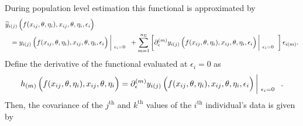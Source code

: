 \documentclass{article}
\begin{document}
During population level estimation this functional is approximated by
  \begin{eqnarray}
    \lefteqn{ \widetilde{y}_{i(j)} \left( \rule{0.0in}{0.15in} f(x_{ij}, \theta, \eta_i), 
        x_{ij}, \theta, \eta_i, \epsilon_i \right) } 
        \nonumber \\
    & & = y_{i(j)}\left( \rule{0.0in}{0.15in} f(x_{ij}, \theta, \eta_i), 
        x_{ij}, \theta, \eta_i, \epsilon_i \right)
        \left| \!
          \begin{array}{l}
            \\
            {\scriptstyle \epsilon_i = 0}
          \end{array}
        \right.
      + \sum_{m=1}^{n_{\Sigma}} \left[ \partial_{\epsilon}^{(m)} 
        y_{i(j)}\left( \rule{0.0in}{0.15in} f(x_{ij}, \theta, \eta_i), 
        x_{ij}, \theta, \eta_i, \epsilon_i \right)
        \left| \!
          \begin{array}{l}
            \\
            {\scriptstyle \epsilon_i = 0}
          \end{array}
        \right.
        \right] \epsilon_{i(m)} .
  \end{eqnarray}
Define the derivative of the functional evaluated at $\epsilon_i = 0$ as
  \begin{equation}
    h_{(m)}\left( \rule{0.0in}{0.15in} f(x_{ij}, \theta, \eta_i), 
        x_{ij}, \theta, \eta_i \right)
      = \partial_{\epsilon}^{(m)} 
        y_{i(j)}\left( \rule{0.0in}{0.15in} f(x_{ij}, \theta, \eta_i), 
        x_{ij}, \theta, \eta_i, \epsilon_i \right)
        \left| \!
          \begin{array}{l}
            \\
            {\scriptstyle \epsilon_i = 0}
          \end{array}
        \right. .
  \end{equation}
Then, the covariance of the $j^{\mbox{th}}$ and $k^{\mbox{th}}$ values of 
the $i^{\mbox{th}}$ individual's data is given by
\end{document}
